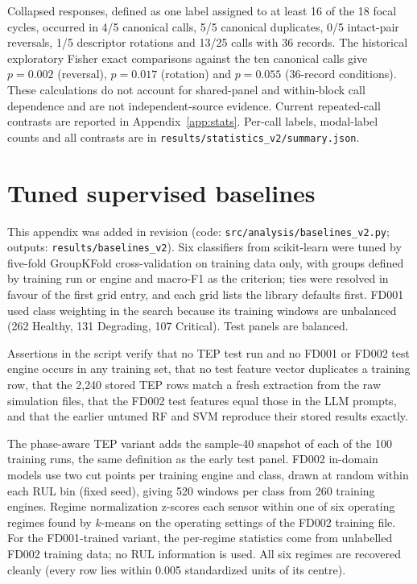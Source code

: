 \documentclass[11pt,a4paper]{article}
\begin{document}
Collapsed responses, defined as one label assigned to at least 16 of the 18 focal cycles, occurred in 4/5 canonical calls, 5/5 canonical duplicates, 0/5 intact-pair reversals, 1/5 descriptor rotations and 13/25 calls with 36 records. The historical exploratory Fisher exact comparisons against the ten canonical calls give $p=0.002$ (reversal), $p=0.017$ (rotation) and $p=0.055$ (36-record conditions). These calculations do not account for shared-panel and within-block call dependence and are not independent-source evidence. Current repeated-call contrasts are reported in Appendix~\ref{app:stats}. Per-call labels, modal-label counts and all contrasts are in \texttt{results/statistics\_v2/summary.json}.

\section{Tuned supervised baselines}\label{app:baselines}
This appendix was added in revision (code: \texttt{src/analysis/baselines\_v2.py}; outputs: \texttt{results/baselines\_v2}). Six classifiers from scikit-learn were tuned by five-fold GroupKFold cross-validation on training data only, with groups defined by training run or engine and macro-F1 as the criterion; ties were resolved in favour of the first grid entry, and each grid lists the library defaults first. FD001 used class weighting in the search because its training windows are unbalanced (262 Healthy, 131 Degrading, 107 Critical). Test panels are balanced.

Assertions in the script verify that no TEP test run and no FD001 or FD002 test engine occurs in any training set, that no test feature vector duplicates a training row, that the 2{,}240 stored TEP rows match a fresh extraction from the raw simulation files, that the FD002 test features equal those in the LLM prompts, and that the earlier untuned RF and SVM reproduce their stored results exactly.

The phase-aware TEP variant adds the sample-40 snapshot of each of the 100 training runs, the same definition as the early test panel. FD002 in-domain models use two cut points per training engine and class, drawn at random within each RUL bin (fixed seed), giving 520 windows per class from 260 training engines. Regime normalization z-scores each sensor within one of six operating regimes found by $k$-means on the operating settings of the FD002 training file. For the FD001-trained variant, the per-regime statistics come from unlabelled FD002 training data; no RUL information is used. All six regimes are recovered cleanly (every row lies within 0.005 standardized units of its centre).
\end{document}

